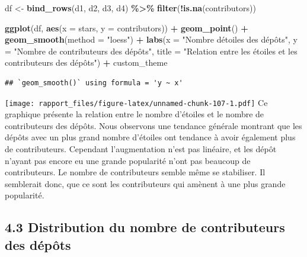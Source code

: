 \documentclass[
]{article}
\newenvironment{Shaded}{\begin{snugshade}}{\end{snugshade}}
\newcommand{\AttributeTok}[1]{\textcolor[rgb]{0.13,0.29,0.53}{#1}}
\newcommand{\FunctionTok}[1]{\textcolor[rgb]{0.13,0.29,0.53}{\textbf{#1}}}
\newcommand{\NormalTok}[1]{#1}
\newcommand{\OtherTok}[1]{\textcolor[rgb]{0.56,0.35,0.01}{#1}}
\newcommand{\SpecialCharTok}[1]{\textcolor[rgb]{0.81,0.36,0.00}{\textbf{#1}}}
\newcommand{\StringTok}[1]{\textcolor[rgb]{0.31,0.60,0.02}{#1}}
\begin{document}
\begin{Shaded}
\begin{Highlighting}[]
\NormalTok{df }\OtherTok{\textless{}{-}} \FunctionTok{bind\_rows}\NormalTok{(d1, d2, d3, d4) }\SpecialCharTok{\%\textgreater{}\%} \FunctionTok{filter}\NormalTok{(}\SpecialCharTok{!}\FunctionTok{is.na}\NormalTok{(contributors))}
\end{Highlighting}
\end{Shaded}

\begin{Shaded}
\begin{Highlighting}[]
\FunctionTok{ggplot}\NormalTok{(df, }\FunctionTok{aes}\NormalTok{(}\AttributeTok{x =}\NormalTok{ stars, }\AttributeTok{y =}\NormalTok{ contributors)) }\SpecialCharTok{+}
  \FunctionTok{geom\_point}\NormalTok{() }\SpecialCharTok{+}
  \FunctionTok{geom\_smooth}\NormalTok{(}\AttributeTok{method =} \StringTok{"loess"}\NormalTok{) }\SpecialCharTok{+}
  \FunctionTok{labs}\NormalTok{(}\AttributeTok{x =} \StringTok{"Nombre d\textquotesingle{}étoiles des dépôts"}\NormalTok{,}
       \AttributeTok{y =} \StringTok{"Nombre de contributeurs des dépôts"}\NormalTok{,}
       \AttributeTok{title =} \StringTok{"Relation entre les étoiles et les contributeurs des dépôts"}\NormalTok{) }\SpecialCharTok{+}
\NormalTok{  custom\_theme}
\end{Highlighting}
\end{Shaded}

\begin{verbatim}
## `geom_smooth()` using formula = 'y ~ x'
\end{verbatim}

\texttt{[image: rapport\_files/figure-latex/unnamed-chunk-107-1.pdf]} Ce
graphique présente la relation entre le nombre d'étoiles et le nombre de
contributeurs des dépôts. Nous observons une tendance générale montrant
que les dépôts avec un plus grand nombre d'étoiles ont tendance à avoir
également plus de contributeurs. Cependant l'augmentation n'est pas
linéaire, et les dépôt n'ayant pas encore eu une grande popularité n'ont
pas beaucoup de contributeurs. Le nombre de contributeurs semble même se
stabiliser. Il semblerait donc, que ce sont les contributeurs qui
amènent à une plus grande popularité.

\subsection{4.3 Distribution du nombre de contributeurs des
dépôts}\label{distribution-du-nombre-de-contributeurs-des-duxe9puxf4ts}
\end{document}
